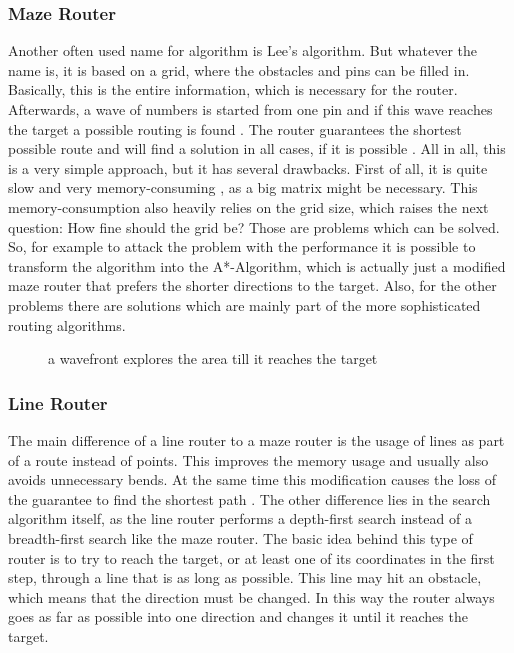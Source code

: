 \subsubsection{Maze Router}
Another often used name for algorithm is Lee's algorithm. But whatever the name is, it is based on a grid, where the obstacles and pins can be filled in. Basically, this is the entire information, which is necessary for the router. Afterwards, a wave of numbers is started from one pin and if this wave reaches the target a possible routing is found . The router guarantees the shortest possible route and will find a solution in all cases, if it is possible \cite[p. 693]{kaufmann:electronic_design_automation}. All in all, this is a very simple approach, but it has several drawbacks. First of all, it is quite slow and very memory-consuming \cite[p. 693]{kaufmann:electronic_design_automation}, as a big matrix might be necessary. This memory-consumption also heavily relies on the grid size, which raises the next question: How fine should the grid be? Those are problems which can be solved. So, for example to attack the problem with the performance it is possible to transform the algorithm into the A*-Algorithm, which is actually just a modified maze router that prefers the shorter directions to the target. Also, for the other problems there are solutions which are mainly part of the more sophisticated routing algorithms.

\begin{figure}
	\centering
	
	\caption{a wavefront explores the area till it reaches the target}
	\label{fig:maze_router}
\end{figure}

\subsubsection{Line Router}
The main difference of a line router to a maze router is the usage of lines as part of a route instead of points. This improves the memory usage and usually also avoids unnecessary bends. At the same time this modification causes the loss of the guarantee to find the shortest path \cite[p. 695]{kaufmann:electronic_design_automation}. The other difference lies in the search algorithm itself, as the line router performs a depth-first search instead of a breadth-first search like the maze router. The basic idea behind this type of router is to try to reach the target, or at least one of its coordinates in the first step, through a line that is as long as possible. This line may hit an obstacle, which means that the direction must be changed. In this way the router always goes as far as possible into one direction and changes it until it reaches the target.

